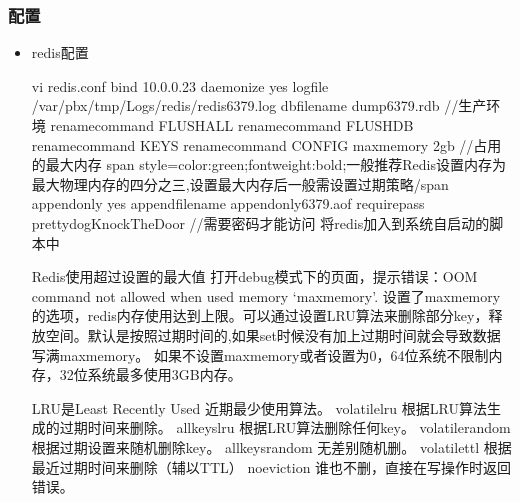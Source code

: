 \documentclass[a4paper,10pt,english]{sphinxmanual}
\begin{document}
\subsubsection{配置}
\label{\detokenize{program/redis:id2}}\begin{itemize}
\item {} 
redis配置

\begin{sphinxVerbatim}[commandchars=\\\{\}]
vi redis.conf
bind 10.0.0.23
daemonize yes
logfile \PYGZdq{}/var/pbx/tmp/Logs/redis/redis\PYGZus{}6379.log\PYGZdq{}
dbfilename dump\PYGZus{}6379.rdb
//生产环境
rename\PYGZhy{}command FLUSHALL \PYGZdq{}\PYGZdq{}
rename\PYGZhy{}command FLUSHDB \PYGZdq{}\PYGZdq{}
rename\PYGZhy{}command KEYS \PYGZdq{}\PYGZdq{}
rename\PYGZhy{}command CONFIG \PYGZdq{}\PYGZdq{}
maxmemory 2gb //占用的最大内存 \PYGZlt{}span style=\PYGZsq{}color:green;font\PYGZhy{}weight:bold;\PYGZsq{}\PYGZgt{}\PYGZlt{}一般推荐Redis设置内存为最大物理内存的四分之三,设置最大内存后一般需设置过期策略\PYGZgt{}\PYGZlt{}/span\PYGZgt{}
appendonly yes
appendfilename \PYGZdq{}appendonly\PYGZus{}6379.aof\PYGZdq{}
requirepass \PYGZdq{}prettydogKnockTheDoor\PYGZdq{} //需要密码才能访问
将redis加入到系统自启动的脚本中

Redis使用超过设置的最大值
打开debug模式下的页面，提示错误：OOM command not allowed when used memory \PYGZgt{} ‘maxmemory’.
设置了maxmemory的选项，redis内存使用达到上限。可以通过设置LRU算法来删除部分key，释放空间。默认是按照过期时间的,如果set时候没有加上过期时间就会导致数据写满maxmemory。
如果不设置maxmemory或者设置为0，64位系统不限制内存，32位系统最多使用3GB内存。

LRU是Least Recently Used 近期最少使用算法。
volatile\PYGZhy{}lru \PYGZhy{}\PYGZgt{} 根据LRU算法生成的过期时间来删除。
allkeys\PYGZhy{}lru \PYGZhy{}\PYGZgt{} 根据LRU算法删除任何key。
volatile\PYGZhy{}random \PYGZhy{}\PYGZgt{} 根据过期设置来随机删除key。
allkeys\PYGZhy{}\PYGZgt{}random \PYGZhy{}\PYGZgt{} 无差别随机删。
volatile\PYGZhy{}ttl \PYGZhy{}\PYGZgt{} 根据最近过期时间来删除（辅以TTL）
noeviction \PYGZhy{}\PYGZgt{} 谁也不删，直接在写操作时返回错误。
\end{sphinxVerbatim}

\end{itemize}
\end{document}
